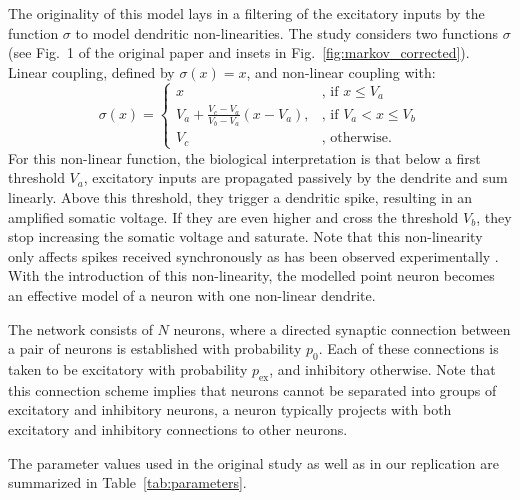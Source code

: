 \documentclass[10pt,a4paper,onecolumn]{article}
\begin{document}
The originality of this model lays in a filtering of the excitatory inputs by the function $\sigma$ to model dendritic non-linearities. The study considers two functions $\sigma$ (see Fig.~1 of the original paper and insets in Fig.~\ref{fig:markov_corrected}). Linear coupling, defined by $\sigma(x)=x$, and non-linear coupling with:
\begin{equation}
    \sigma(x)= 
\begin{cases}
    x              & \text{, if } x\leq V_a\\
    V_a + \frac{V_c-V_a}{V_b-V_a} (x - V_a), & \text{, if } V_a<x \leq V_b\\
    V_c            & \text{, otherwise.}
\end{cases}
\label{eq:non-linear}
\end{equation}
For this non-linear function, the biological interpretation is that below a first threshold $V_a$, excitatory inputs are propagated passively by the dendrite and sum linearly. Above this threshold, they trigger a dendritic spike, resulting in an amplified somatic voltage. If they are even higher and cross the threshold $V_b$, they stop increasing the somatic voltage and saturate. Note that this non-linearity only affects spikes received synchronously as has been observed experimentally \cite{Softky1994}. With the introduction of this non-linearity, the modelled point neuron becomes an effective model of a neuron with one non-linear dendrite.

The network consists of $N$ neurons, where a directed synaptic connection between a pair of neurons is established with probability $p_0$. Each of these connections is taken to be excitatory with probability $p_\text{ex}$, and inhibitory otherwise. Note that this connection scheme implies that neurons cannot be separated into groups of excitatory and inhibitory neurons, a neuron typically projects with both excitatory and inhibitory connections to other neurons.

The parameter values used in the original study as well as in our replication are summarized in Table~\ref{tab:parameters}.
\end{document}
